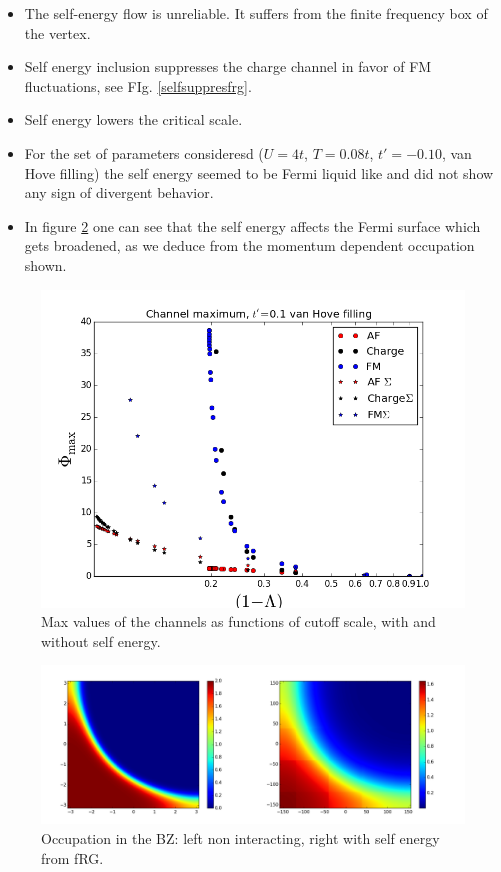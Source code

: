 \begin{itemize}

\item The self-energy flow is unreliable. It suffers from the finite frequency box of the vertex. 

\item Self energy inclusion suppresses the charge channel in favor of FM fluctuations, see FIg. \ref{selfsuppresfrg}. 

\item Self energy lowers the critical scale.

\item For the set of parameters consideresd ($U=4t$, $T=0.08t$, $t'=-0.10$, van Hove filling) the self energy seemed to be Fermi liquid like and did not show any sign of divergent behavior. 

\item In figure \ref{fermisurface} one can see that the self energy affects the Fermi surface which gets broadened, as we deduce from the momentum dependent occupation shown. 

\end{itemize}

\begin{figure}
\includegraphics[scale=0.7]{images/sevsnose.png}
\caption{Max values of the channels as functions of cutoff scale, with and without self energy. }
\label{selfsuppressfrg}
 \end{figure}
 
 \begin{figure}
 \includegraphics[scale=0.3]{images/Fermi_occupation_sevsnose.png}
 \caption{Occupation in the BZ: left non interacting, right with self energy from fRG.}
\label{fermisurface}
 \end{figure}
